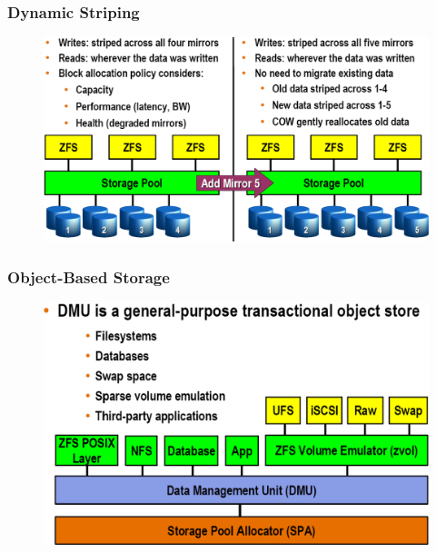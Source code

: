 \begin{frame}[fragile]
    \frametitle{Dynamic Striping}
    \begin{figure}
    \includegraphics[width=0.8\linewidth]{figs/ZFS-striping.png}
    \end{figure}
\end{frame}
% 
% 
% 
\begin{frame}[fragile]
    \frametitle{Object-Based Storage}
    \begin{figure}
    \includegraphics[width=0.7\linewidth]{figs/ZFS-storage.png}
    \end{figure}

\end{frame}
% 
